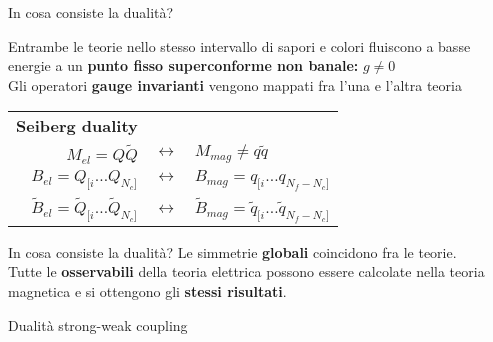 \documentclass[10pt,compress,usenames,dvipsnames]{beamer}
\begin{document}
\begin{frame}{In cosa consiste la dualità?}
\begin{block}{}
Entrambe le teorie nello stesso intervallo di sapori e colori fluiscono a basse energie a un \alert{\bfseries punto fisso superconforme non banale:} $g \neq 0$
\\
\vspace{0.3cm}
Gli operatori \alert{\bfseries gauge invarianti} vengono mappati fra l'una e l'altra teoria
\begin{table}
\begin{tabular}{r l }
{\bfseries Seiberg duality} &  \\
$M_{el}=Q \tilde{Q} $ & $\longleftrightarrow \quad M_{mag} \neq q \tilde{q}$ \\
$B_{el} = Q_{[i} \dotsc Q_{N_c]}$ & $\longleftrightarrow \quad B_{mag} = q_{[i} \dotsc q_{N_f - N_c]}$\\
$\tilde{B}_{el} = \tilde{Q}_{[i} \dotsc \tilde{Q}_{N_c]}$ & $\longleftrightarrow \quad \tilde{B}_{mag} = \tilde{q}_{[i} \dotsc \tilde{q}_{N_f - N_c]}$\\
\end{tabular}
\end{table}
\end{block}
\end{frame}
\begin{frame}{In cosa consiste la dualità?}
Le simmetrie \alert{\bfseries globali} coincidono fra le teorie.
\\
\vspace{0,1cm}
Tutte le \alert{\bfseries osservabili} della teoria elettrica possono essere calcolate nella teoria magnetica e si ottengono gli \alert{\bfseries stessi risultati}. \\
\vspace{0.3cm}


\end{frame}




\begin{frame}{Dualità strong-weak coupling}


\end{frame}
\end{document}
